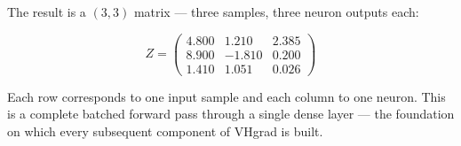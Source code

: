\documentclass[12pt,a4paper]{report}
\begin{document}
The result is a $(3, 3)$ matrix — three samples, three neuron outputs each:

\begin{equation}
    Z = \begin{pmatrix}
        4.800 & 1.210 & 2.385 \\
        8.900 & -1.810 & 0.200 \\
        1.410 & 1.051 & 0.026
    \end{pmatrix}
\end{equation}

Each row corresponds to one input sample and each column to one neuron.
This is a complete batched forward pass through a single dense layer —
the foundation on which every subsequent component of VHgrad is built.
\end{document}
